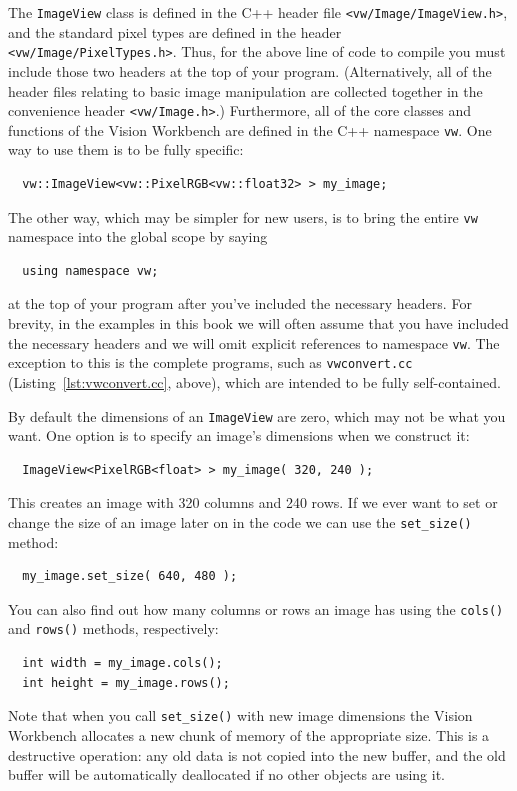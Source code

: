 The \verb#ImageView# class is defined in the C++ header file
\verb#<vw/Image/ImageView.h>#, and the standard pixel types are
defined in the header \verb#<vw/Image/PixelTypes.h>#.  Thus, for the
above line of code to compile you must include those two headers at
the top of your program.  (Alternatively, all of the header files
relating to basic image manipulation are collected together in the
convenience header \verb#<vw/Image.h>#.)  Furthermore, all of the core
classes and functions of the Vision Workbench are defined in the C++
namespace \verb#vw#.  One way to use them is to be fully specific:
\begin{verbatim}
  vw::ImageView<vw::PixelRGB<vw::float32> > my_image;
\end{verbatim}
The other way, which may be simpler for new users, is to bring the
entire \verb#vw# namespace into the global scope by saying
\begin{verbatim}
  using namespace vw;
\end{verbatim}
at the top of your program after you've included the necessary
headers.  For brevity, in the examples in this book we will often
assume that you have included the necessary headers and we will omit
explicit references to namespace \verb#vw#.  The exception to this is
the complete programs, such as \verb#vwconvert.cc#
(Listing~\ref{lst:vwconvert.cc}, above), which are intended to be
fully self-contained.

By default the dimensions of an \verb#ImageView# are zero, which may not
be what you want.  One option is to specify an image's dimensions when
we construct it:
\begin{verbatim}
  ImageView<PixelRGB<float> > my_image( 320, 240 );
\end{verbatim}
This creates an image with 320 columns and 240 rows.  If we ever want to
set or change the size of an image later on in the code we can use the
\verb#set_size()# method:
\begin{verbatim}
  my_image.set_size( 640, 480 );
\end{verbatim}
You can also find out how many columns or rows an image has using the
\verb#cols()# and \verb#rows()# methods, respectively:
\begin{verbatim}
  int width = my_image.cols();
  int height = my_image.rows();
\end{verbatim}
Note that when you call \verb#set_size()# with new image dimensions
the Vision Workbench allocates a new chunk of memory of the
appropriate size.  This is a destructive operation: any old data is
not copied into the new buffer, and the old buffer will be
automatically deallocated if no other objects are using it.

